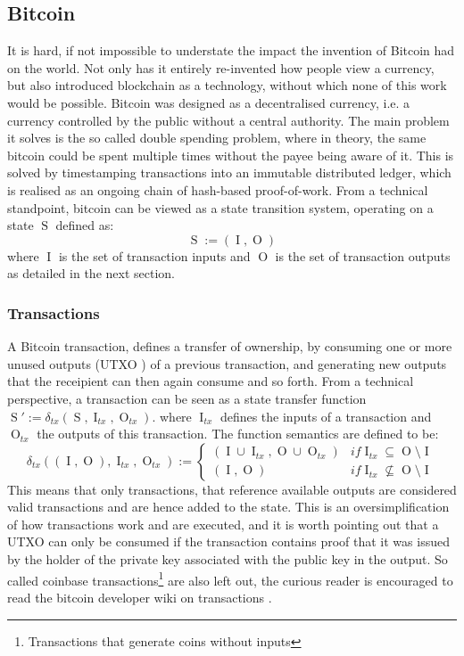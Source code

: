 \documentclass[12pt,msc,a4paper,oneside]{ucl_thesis}
\DeclareMathOperator{\Btcstate}{S}
\DeclareMathOperator{\Btcinput}{I}
\DeclareMathOperator{\Btcoutput}{O}
\begin{document}
\subsection{Bitcoin} \label{sec:background_bitcoin}
It is hard, if not impossible to understate the impact the invention of Bitcoin had on the world. Not only has it entirely re-invented how people view a currency, but also introduced blockchain as a technology, without which none of this work would be possible. Bitcoin was designed as a decentralised currency, i.e. a currency controlled by the public without a central authority. The main problem it solves is the so called double spending problem, where in theory, the same bitcoin could be spent multiple times without the payee being aware of it. This is solved by timestamping transactions into an immutable distributed ledger, which is realised as an ongoing chain of hash-based proof-of-work. From a technical standpoint, bitcoin can be viewed as a state transition system, operating on a state $\Btcstate$ defined as:
\begin{equation}
    \Btcstate := (\Btcinput, \Btcoutput)
\end{equation}
where $\Btcinput$ is the set of transaction inputs and $\Btcoutput$ is the set of transaction outputs as detailed in the next section.

\subsubsection{Transactions}
A Bitcoin transaction, defines a transfer of ownership, by consuming one or more unused outputs (UTXO \cite{bitcoin_wiki:utxo}) of a previous transaction, and generating new outputs that the receipient can then again consume and so forth. From a technical perspective, a transaction can be seen as a state transfer function $\Btcstate' := \delta_{tx}(\Btcstate, \Btcinput_{tx}, \Btcoutput_{tx})$. where $\Btcinput_{tx}$ defines the inputs of a transaction and $\Btcoutput_{tx}$ the outputs of this transaction. The function semantics are defined to be:
\begin{equation}
    \delta_{tx}((\Btcinput, \Btcoutput), \Btcinput_{tx}, \Btcoutput_{tx}) := \begin{cases}
        (\Btcinput \cup \Btcinput_{tx}, \Btcoutput \cup \Btcoutput_{tx}) & if \Btcinput_{tx} \subseteq \Btcoutput \setminus \Btcinput \\
        (\Btcinput, \Btcoutput) & if \Btcinput_{tx} \not\subseteq \Btcoutput \setminus \Btcinput
    \end{cases}
\end{equation}
This means that only transactions, that reference available outputs are considered valid transactions and are hence added to the state. This is an oversimplification of how transactions work and are executed, and it is worth pointing out that a UTXO can only be consumed if the transaction contains proof that it was issued by the holder of the private key associated with the public key in the output. So called coinbase transactions\footnote{Transactions that generate coins without inputs} are also left out, the curious reader is encouraged to read the bitcoin developer wiki on transactions \cite{bitcoin_wiki:transactions}.
\end{document}
